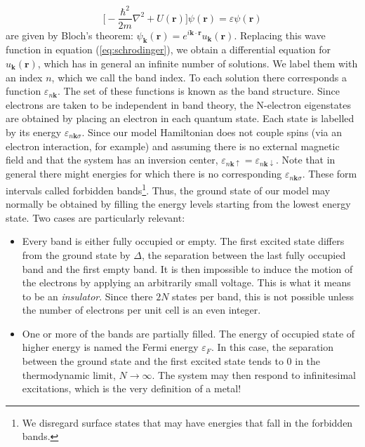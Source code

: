 \documentclass[10pt, twocolumn, twoside]{article}
\begin{document}
\begin{equation}\label{eq:schrodinger}
\bigg[ -\frac{\hbar^2}{2m} \nabla^2 + U(\bm r) \bigg] \psi (\bm r) = \varepsilon \psi (\bm r)
\end{equation}
are given by Bloch's theorem: $\psi_{\bm k} (\bm r) = e^{i\bm k \cdot \bm r} u_{\bm k} (\bm r)$. Replacing this wave function in equation (\ref{eq:schrodinger}), we obtain a differential equation for $u_{\bm k} (\bm r)$, which has in general an infinite number of solutions. We label them with an index $n$, which we call the band index. To each solution there corresponds a function $\varepsilon_{n\bm k}$. The set of these functions is known as the band structure. Since electrons are taken to be independent in band theory, the N-electron eigenstates are obtained by placing an electron in each quantum state. Each state is labelled by its energy $\varepsilon_{n\bm k \sigma}$. Since our model Hamiltonian does not couple spins (via an electron interaction, for example) and assuming there is no external magnetic field and that the system has an inversion center, $\varepsilon_{n\bm k \uparrow} = \varepsilon_{n\bm k \downarrow}$. Note that in general there might energies for which there is no corresponding $\varepsilon_{n\bm k \sigma}$. These form intervals called forbidden bands\footnote{We disregard surface states that may have energies that fall in the forbidden bands.}. Thus, the ground state of our model may normally be obtained by filling the energy levels starting from the lowest energy state. Two cases are particularly relevant:
\begin{itemize}
\item Every band is either fully occupied or empty. The first excited state differs from the ground state by $\Delta$, the separation between the last fully occupied band and the first empty band. It is then impossible to induce the motion of the electrons by applying an arbitrarily small voltage. This is what it means to be an \emph{insulator}. Since there $2N$ states per band, this is not possible unless the number of electrons per unit cell is an even integer.
\item One or more of the bands are partially filled. The energy of occupied state of higher energy is named the Fermi energy $\varepsilon_F$. In this case, the separation between the ground state and the first excited state tends to $0$ in the thermodynamic limit, $N \rightarrow \infty$. The system may then respond to infinitesimal excitations, which is the very definition of a metal!
\end{itemize}
\end{document}
